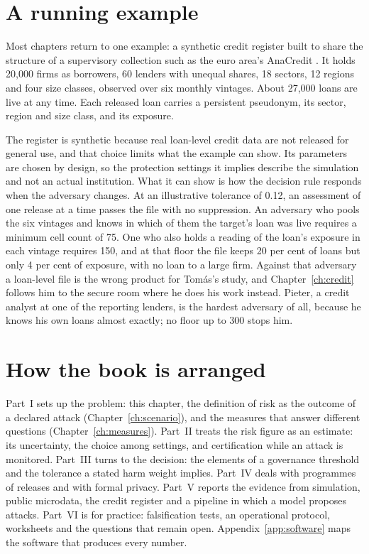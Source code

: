 \section{A running example}

Most chapters return to one example: a synthetic credit register built to share the
structure of a supervisory collection such as the euro area's AnaCredit
\citep{israel2017}. It holds 20,000 firms as borrowers, 60 lenders with unequal shares, 18
sectors, 12 regions and four size classes, observed over six monthly vintages. About 27,000
loans are live at any time. Each released loan carries a persistent pseudonym, its sector,
region and size class, and its exposure.

The register is synthetic because real loan-level credit data are not released for general
use, and that choice limits what the example can show. Its parameters are chosen by design,
so the protection settings it implies describe the simulation and not an actual institution.
What it can show is how the decision rule responds when the adversary changes. At an
illustrative tolerance of 0.12, an assessment of one release at a time passes the file with
no suppression. An adversary who pools the six vintages and knows in which of them the
target's loan was live requires a minimum cell count of 75. One who also holds a reading of
the loan's exposure in each vintage requires 150, and at that floor the file keeps 20 per
cent of loans but only 4 per cent of exposure, with no loan to a large firm.
Against that adversary a loan-level file is the wrong product for Tomás's study, and
Chapter~\ref{ch:credit} follows him to the secure room where he does his work instead. Pieter,
a credit analyst at one of the reporting lenders, is the hardest adversary of all, because
he knows his own loans almost exactly; no floor up to 300 stops him.

\section{How the book is arranged}

Part~I sets up the problem: this chapter, the definition of risk as the outcome of a declared
attack (Chapter~\ref{ch:scenario}), and the measures that answer different questions
(Chapter~\ref{ch:measures}). Part~II treats the risk figure as an estimate: its uncertainty,
the choice among settings, and certification while an attack is monitored. Part~III turns to
the decision: the elements of a governance threshold and the tolerance a stated harm weight
implies. Part~IV deals with programmes of releases and with formal privacy. Part~V reports the
evidence from simulation, public microdata, the credit register and a pipeline in which a
model proposes attacks. Part~VI is for practice: falsification tests, an operational protocol,
worksheets and the questions that remain open. Appendix~\ref{app:software} maps the software
that produces every number.

